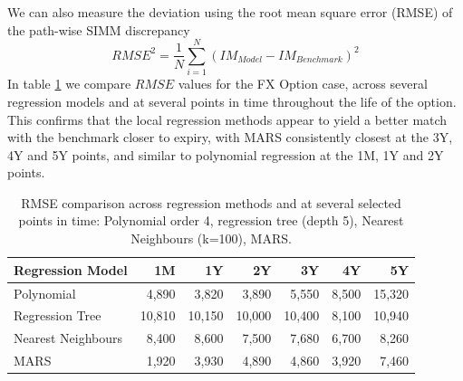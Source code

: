 \documentclass[11pt,a4paper,oneside]{article}
\newcommand{\IM}{\mathit{IM}}
\newcommand{\RMSE}{\mathit{RMSE}}
\begin{document}
We can also measure the deviation using the root mean square error (RMSE) of the path-wise SIMM discrepancy
$$
\RMSE^2 = \frac{1}{N}\sum_{i=1}^N (\IM_{Model} - \IM_{Benchmark})^2
$$
In table \ref{tab:simm_error_fxoption} we
compare $\RMSE$ values for the FX Option case, across several regression models and at several points in time throughout the life of the
option. This confirms that the local regression methods appear to yield a better match with the benchmark closer to expiry, with
MARS consistently closest at the 3Y, 4Y and 5Y points, and similar to polynomial regression at the 1M, 1Y and 2Y points.
\begin{table}[hbt]
  \centering
  \begin{tabular}{|l|r|r|r|r|r|r|}
    \hline
    Regression Model         &  1M    & 1Y     & 2Y     & 3Y     & 4Y     & 5Y \\
    \hline
    \hline
    Polynomial               &  4,890 &  3,820 &  3,890 &  5,550 &  8,500 & 15,320 \\
    \hline 
    Regression Tree          & 10,810 & 10,150 & 10,000 & 10,400 &  8,100 & 10,940 \\
    \hline
    Nearest Neighbours        &  8,400 &  8,600 &  7,500 &  7,680 &  6,700 &  8,260  \\
    \hline
    MARS                     &  1,920 &  3,930 &  4,890 &  4,860 &  3,920 &  7,460 \\
    \hline
  \end{tabular}
  \caption{RMSE comparison across regression methods and at several selected points in time: Polynomial order 4, regression tree (depth 5), Nearest Neighbours (k=100), MARS. }
  \label{tab:simm_error_fxoption}
\end{table}
\end{document}

